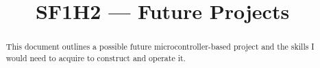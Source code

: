 \documentclass[conference]{IEEEtran}
\begin{document}
\title{SF1H2 — Future Projects}

\author{
}

\maketitle

\begin{abstract}
  This document outlines a possible future microcontroller-based project and the skills I would need to acquire to construct and operate it.
\end{abstract}
\end{document}

